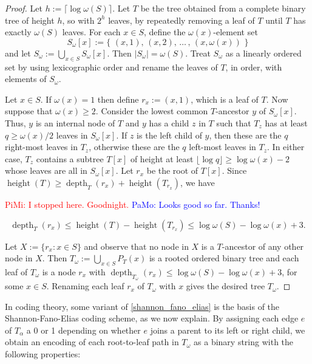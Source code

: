 \documentclass{patmorin}
\DeclareMathOperator{\height}{height}
\DeclareMathOperator{\depth}{depth}
\renewcommand{\ge}{\geqslant}
\renewcommand{\le}{\leqslant}
\renewcommand{\geq}{\geqslant}
\newcommand{\pat}[1]{\textcolor{Blue}{PaMo: #1}}
\newcommand{\piotr}[1]{\textcolor{red}{PiMi: #1}}
\begin{document}
   \begin{proof}
     Let $h:=\lceil\log\omega(S)\rceil$.
     Let $T$ be the tree obtained from a complete binary tree of height $h$, so with $2^h$ leaves, by repeatedly removing a leaf of $T$ until $T$ has exactly $\omega(S)$ leaves.
     For each $x\in S$, define the $\omega(x)$-element set
     \[  S_{\omega}[x]:=\{\,\,(x,1),\,(x,2),\,\ldots\,,\,(x,\omega(x))\,\,\} \]
     and let $S_\omega:=\bigcup_{x\in S}S_{\omega}[x]$.  Then $|S_\omega|=\omega(S)$.  Treat $S_{\omega}$ as a linearly ordered set by using lexicographic order and rename the leaves of $T$, in order, with elements of $S_{\omega}$.


     Let $x\in S$.
     If $\omega(x)=1$ then define $r_x:=(x,1)$, which is a leaf of $T$.
     Now suppose that $\omega(x)\geq2$.
     Consider the lowest common $T$-ancestor $y$ of $S_{\omega}[x]$.
     Thus, $y$ is an internal node of $T$ and
     $y$ has a child $z$ in $T$ such that $T_z$ has at least $q\geq\omega(x)/2$ leaves in $S_{\omega}[x]$.
     If $z$ is the left child of $y$, then these are the $q$ right-most leaves in $T_z$, otherwise these are the $q$ left-most leaves in $T_z$.  In either case, $T_z$ contains a subtree $T[x]$ of height at least $\lfloor\log q\rfloor\ge \log\omega(x) - 2$ whose leaves are all in $S_{\omega}[x]$.
     Let $r_x$ be the root of $T[x]$.  Since $\height(T)\ge \depth_T(r_x)+\height(T_{r_x})$, we have

      \piotr{I stopped here. Goodnight.}  \pat{Looks good so far. Thanks!}

     \[
     \depth_T(r_x)\le \height(T)-\height(T_{r_x})\le \log\omega(S) -\log\omega(x) + 3.
     \]

     Let $X:=\{r_x:x\in S\}$ and observe that no node in $X$ is a $T$-ancestor of any other node in $X$. Then $T_\omega:=\bigcup_{x\in S}P_T(x)$ is a rooted ordered binary tree and each leaf of $T_\omega$ is a node $r_x$ with $\depth_{T_\omega}(r_x)\le \log\omega(S)-\log\omega(x)+3$, for some $x\in S$.  Renaming each leaf $r_x$ of $T_\omega$ with $x$ gives the desired tree $T_\omega$.
   \end{proof}




  In coding theory, some variant of \cref{shannon_fano_elias} is the basis of the Shannon-Fano-Elias coding scheme, as we now explain.  By assigning each edge $e$ of $T_\alpha$ a 0 or 1 depending on whether $e$ joins a parent to its left or right child, we obtain an encoding of each root-to-leaf path in $T_\omega$ as a binary string with the following properties:
\end{document}
